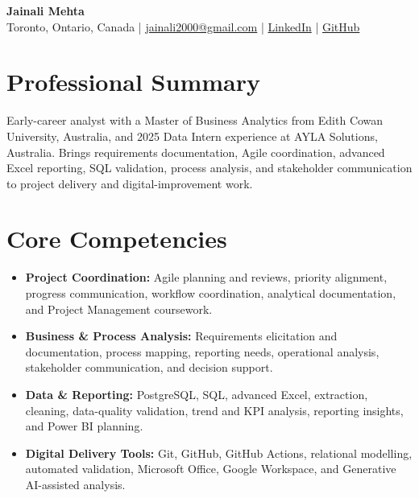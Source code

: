 \documentclass[letterpaper,10pt]{article}
\begin{document}
\begin{center}
  {\fontsize{17}{19}\selectfont\textbf{Jainali Mehta}}\\[2pt]
  \small Toronto, Ontario, Canada \;|\;
  \href{mailto:jainali2000@gmail.com}{jainali2000@gmail.com} \;|\;
  \href{https://www.linkedin.com/in/jainali-mehta}{LinkedIn} \;|\;
  \href{https://github.com/jainalimehta}{GitHub}
\end{center}
\vspace{-7pt}

\section{Professional Summary}
\small Early-career analyst with a Master of Business Analytics from Edith Cowan University, Australia, and 2025 Data Intern experience at AYLA Solutions, Australia. Brings requirements documentation, Agile coordination, advanced Excel reporting, SQL validation, process analysis, and stakeholder communication to project delivery and digital-improvement work.

\section{Core Competencies}
\begin{itemize}[leftmargin=0.16in,label=\textbullet,topsep=0pt,itemsep=1pt,parsep=0pt]
  \item \small \textbf{Project Coordination:} Agile planning and reviews, priority alignment, progress communication, workflow coordination, analytical documentation, and Project Management coursework.
  \item \small \textbf{Business \& Process Analysis:} Requirements elicitation and documentation, process mapping, reporting needs, operational analysis, stakeholder communication, and decision support.
  \item \small \textbf{Data \& Reporting:} PostgreSQL, SQL, advanced Excel, extraction, cleaning, data-quality validation, trend and KPI analysis, reporting insights, and Power BI planning.
  \item \small \textbf{Digital Delivery Tools:} Git, GitHub, GitHub Actions, relational modelling, automated validation, Microsoft Office, Google Workspace, and Generative AI-assisted analysis.
\end{itemize}
\end{document}
